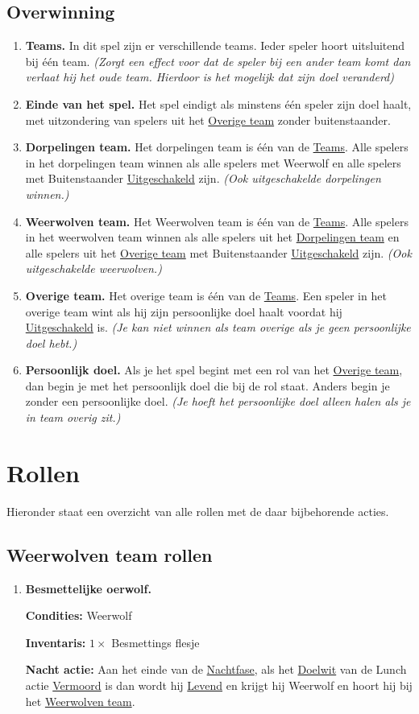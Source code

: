 \documentclass{article}
\newenvironment{rulesubsection}[1]{
    \subsection{#1} \label{rule:#1}
    \begin{enumerate}[label=\thesubsection.\arabic{enumi}]
}{
    \end{enumerate}
}
\newcommand{\ruleitem}[1]{\item \label{rule:#1} \textbf{#1.}}
\newcommand{\roleinv}{
    
    \textbf{Inventaris:}
}
\newcommand{\rolenaction}[1][]{

    \textbf{Nacht actie{\normalfont\ifthenelse{\isempty{#1}}{}{ (#1)}}:}
}
\newcommand{\rolecond}{

    \textbf{Condities:}
}
\newcommand{\ruleref}[1]{\hyperref[rule:#1]{#1}}
\begin{document}
\begin{rulesubsection}{Overwinning}
    \ruleitem{Teams} In dit spel zijn er verschillende teams. Ieder speler hoort uitsluitend bij één team.
    \textit{(Zorgt een effect voor dat de speler bij een ander team komt dan verlaat hij het oude team.
    Hierdoor is het mogelijk dat zijn doel veranderd)}
    \ruleitem{Einde van het spel} Het spel eindigt als minstens één speler zijn doel haalt, met uitzondering van spelers uit het \ruleref{Overige team}
    zonder buitenstaander.
    \ruleitem{Dorpelingen team} Het dorpelingen team is één van de \ruleref{Teams}. Alle spelers in het dorpelingen team winnen als alle spelers met
    Weerwolf en alle spelers met Buitenstaander \ruleref{Uitgeschakeld} zijn. \textit{(Ook uitgeschakelde dorpelingen winnen.)}
    \ruleitem{Weerwolven team} Het Weerwolven team is één van de \ruleref{Teams}. Alle spelers in het weerwolven team winnen als alle spelers
    uit het \ruleref{Dorpelingen team} en alle spelers uit het \ruleref{Overige team} met Buitenstaander \ruleref{Uitgeschakeld} zijn. \textit{(Ook uitgeschakelde weerwolven.)}
    \ruleitem{Overige team} Het overige team is één van de \ruleref{Teams}. Een speler in het overige team wint als hij zijn persoonlijke doel 
    haalt voordat hij \ruleref{Uitgeschakeld} is. \textit{(Je kan niet winnen als team overige als je geen persoonlijke doel hebt.)}
    \ruleitem{Persoonlijk doel} Als je het spel begint met een rol van het \ruleref{Overige team}, dan begin je met het persoonlijk doel die bij de rol staat.
    Anders begin je zonder een persoonlijke doel. \textit{(Je hoeft het persoonlijke doel alleen halen als je in team overig zit.)}
\end{rulesubsection}

\section{Rollen}
Hieronder staat een overzicht van alle rollen met de daar bijbehorende acties.
\begin{rulesubsection}{Weerwolven team rollen}
    \ruleitem{Besmettelijke oerwolf}
    \rolecond Weerwolf
    \roleinv $1\times$ Besmettings flesje
    \rolenaction[besmettings flesje] Aan het einde van de \ruleref{Nachtfase}, als het \ruleref{Doelwit} van de Lunch actie
    \ruleref{Vermoord} is dan wordt hij \ruleref{Levend} en krijgt hij Weerwolf en hoort hij bij het \ruleref{Weerwolven team}.
\end{rulesubsection}
\end{document}
